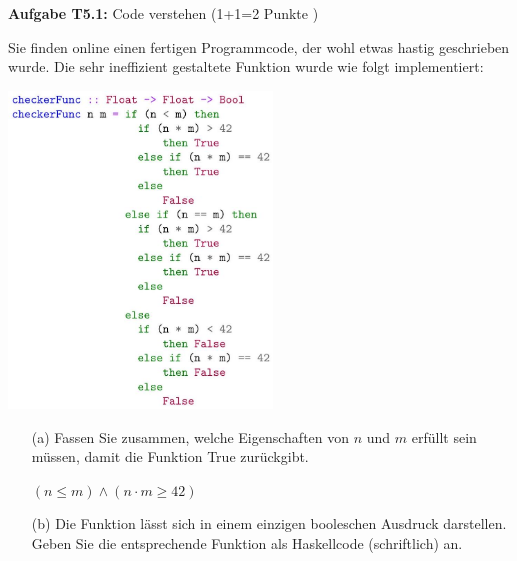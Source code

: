\RequirePackage{fix-cm}


\newcommand{\obenlinks}{Übungen zur Vorlesung Informatik I}   %




\graphicspath{ {./images/} }

\textbf{Aufgabe T5.1:} Code verstehen (1+1=2 Punkte )

Sie finden online einen fertigen Programmcode, der wohl etwas hastig geschrieben wurde. Die sehr ineffizient gestaltete Funktion 
wurde wie folgt implementiert:

\includegraphics[width=7cm]{2022_11_15_0a5a2eee0aef383b0ce9g-1}

\begin{itemize}
  \item [(a)] Fassen Sie zusammen, welche Eigenschaften von $n$ und $m$ erfüllt sein müssen, damit die Funktion True zurückgibt.

  $(n \le m) \land (n \cdot m \ge 42)$

  \item [(b)] Die Funktion lässt sich in einem einzigen booleschen Ausdruck darstellen. Geben Sie die entsprechende Funktion als 
  Haskellcode (schriftlich) an.

  \inputminted{Haskell}{A5_1.hs}
  
\end{itemize}

